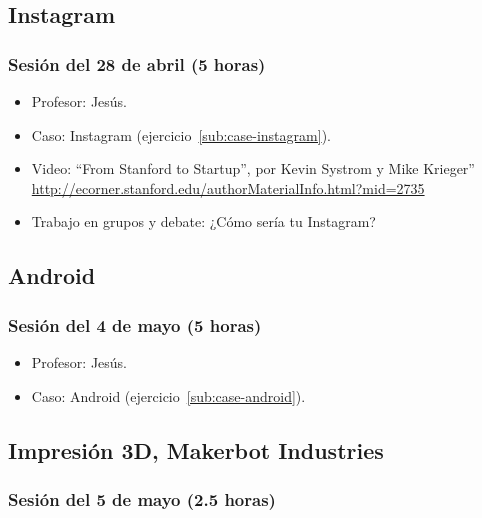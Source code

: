 \documentclass[a4paper,12pt]{article}
\begin{document}
\subsection{Instagram}

\subsubsection{Sesión del 28 de abril (5 horas)}

\begin{itemize}
\item Profesor: Jesús.
\item Caso: Instagram (ejercicio~\ref{sub:case-instagram}).
\item Video: ``From Stanford to Startup'', por Kevin Systrom y Mike Krieger'' \\
  \url{http://ecorner.stanford.edu/authorMaterialInfo.html?mid=2735}
\item Trabajo en grupos y debate: ¿Cómo sería tu Instagram?
\end{itemize}

\subsection{Android}

\subsubsection{Sesión del 4 de mayo (5 horas)}

\begin{itemize}
\item Profesor: Jesús.
\item Caso: Android (ejercicio~\ref{sub:case-android}).
\end{itemize}


\subsection{Impresión 3D, Makerbot Industries}

\subsubsection{Sesión del 5 de mayo (2.5 horas)}
\end{document}
